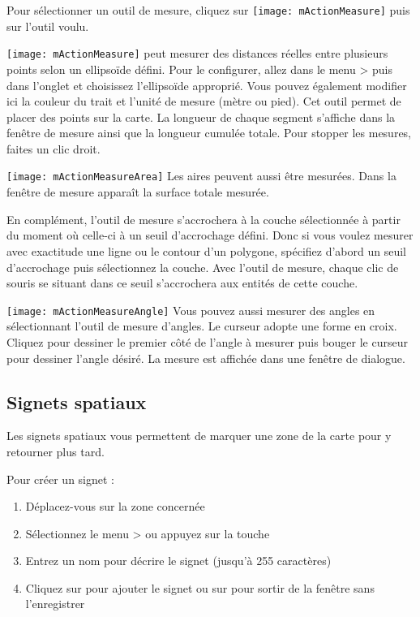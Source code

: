 Pour sélectionner un outil de mesure, cliquez sur \texttt{[image: mActionMeasure]} puis sur l'outil voulu.

\texttt{[image: mActionMeasure]} 
\qg peut mesurer des distances réelles entre plusieurs points selon un ellipsoïde défini. Pour le configurer, allez dans le menu  >  puis dans l'onglet  et choisissez l'ellipsoïde approprié. Vous pouvez également modifier ici la couleur du trait et l'unité de mesure (mètre ou pied). Cet outil permet de placer des points sur la carte. La longueur de chaque segment s'affiche dans la fenêtre de mesure ainsi que la longueur cumulée totale. Pour stopper les mesures, faites un clic droit. \par
\texttt{[image: mActionMeasureArea]} Les aires peuvent aussi être mesurées.
Dans la fenêtre de mesure apparaît la surface totale mesurée. \par
En complément, l'outil de mesure s'accrochera à la couche sélectionnée à partir du moment où celle-ci à un seuil d'accrochage défini. Donc si vous voulez mesurer avec exactitude une ligne ou le contour d'un polygone, spécifiez d'abord un seuil d'accrochage puis sélectionnez la couche. Avec l'outil de mesure, chaque clic de souris se situant dans ce seuil s'accrochera aux entités de cette couche. \par
\texttt{[image: mActionMeasureAngle]}
Vous pouvez aussi mesurer des angles en sélectionnant l'outil de mesure d'angles. Le curseur adopte une forme en croix. Cliquez pour dessiner le premier côté de l'angle à mesurer puis bouger le curseur pour dessiner l'angle désiré. La mesure est affichée dans une fenêtre de dialogue.

\subsection{Signets spatiaux} \label{sec:bookmarks}

Les signets spatiaux vous permettent de marquer une zone de la carte pour y retourner plus tard.

Pour créer un signet :
\begin{enumerate}
\item Déplacez-vous sur la zone concernée
\item Sélectionnez le menu  >  ou appuyez sur la touche 
\item Entrez un nom pour décrire le signet (jusqu'à 255 caractères)
\item Cliquez sur  pour ajouter le signet ou sur  pour sortir de la fenêtre sans l'enregistrer
\end{enumerate}

